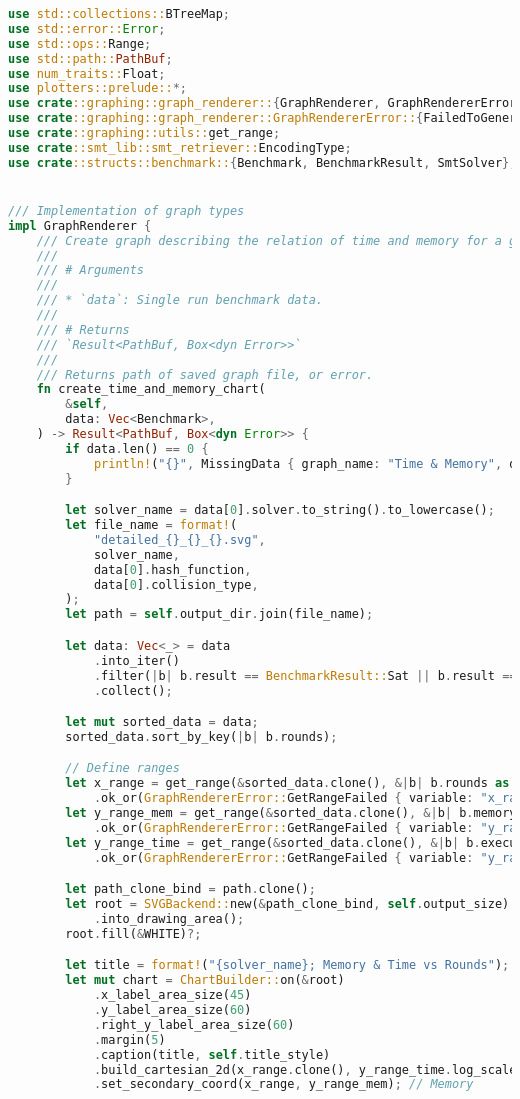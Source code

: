 \begin{lstlisting}[language=rust, caption={graphing/graphs.rs}]
use std::collections::BTreeMap;
use std::error::Error;
use std::ops::Range;
use std::path::PathBuf;
use num_traits::Float;
use plotters::prelude::*;
use crate::graphing::graph_renderer::{GraphRenderer, GraphRendererError};
use crate::graphing::graph_renderer::GraphRendererError::{FailedToGenerate, MissingData};
use crate::graphing::utils::get_range;
use crate::smt_lib::smt_retriever::EncodingType;
use crate::structs::benchmark::{Benchmark, BenchmarkResult, SmtSolver};


/// Implementation of graph types
impl GraphRenderer {
	/// Create graph describing the relation of time and memory for a given run.
	///
	/// # Arguments
	///
	/// * `data`: Single run benchmark data.
	///
	/// # Returns
	/// `Result<PathBuf, Box<dyn Error>>`
	///
	/// Returns path of saved graph file, or error.
	fn create_time_and_memory_chart(
		&self,
		data: Vec<Benchmark>,
	) -> Result<PathBuf, Box<dyn Error>> {
		if data.len() == 0 {
			println!("{}", MissingData { graph_name: "Time & Memory", dataset_name: "data" });
		}

		let solver_name = data[0].solver.to_string().to_lowercase();
		let file_name = format!(
			"detailed_{}_{}_{}.svg",
			solver_name,
			data[0].hash_function,
			data[0].collision_type,
		);
		let path = self.output_dir.join(file_name);

		let data: Vec<_> = data
			.into_iter()
			.filter(|b| b.result == BenchmarkResult::Sat || b.result == BenchmarkResult::Unsat)
			.collect();

		let mut sorted_data = data;
		sorted_data.sort_by_key(|b| b.rounds);

		// Define ranges
		let x_range = get_range(&sorted_data.clone(), &|b| b.rounds as u32)
			.ok_or(GraphRendererError::GetRangeFailed { variable: "x_range"})?;
		let y_range_mem = get_range(&sorted_data.clone(), &|b| b.memory_bytes as f64 / 1048576.0)
			.ok_or(GraphRendererError::GetRangeFailed { variable: "y_range_mem"})?;
		let y_range_time = get_range(&sorted_data.clone(), &|b| b.execution_time.as_secs_f64())
			.ok_or(GraphRendererError::GetRangeFailed { variable: "y_range_time"})?;

		let path_clone_bind = path.clone();
		let root = SVGBackend::new(&path_clone_bind, self.output_size)
			.into_drawing_area();
		root.fill(&WHITE)?;

		let title = format!("{solver_name}; Memory & Time vs Rounds");
		let mut chart = ChartBuilder::on(&root)
			.x_label_area_size(45)
			.y_label_area_size(60)
			.right_y_label_area_size(60)
			.margin(5)
			.caption(title, self.title_style)
			.build_cartesian_2d(x_range.clone(), y_range_time.log_scale().base(2.0))? // Time
			.set_secondary_coord(x_range, y_range_mem); // Memory


\end{lstlisting}
